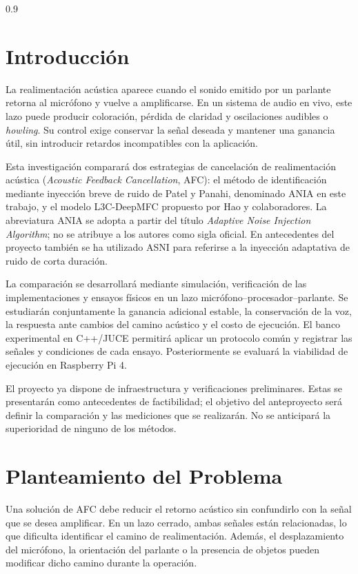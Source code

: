 \clearpage
\begin{spacing}{0.9}
\tableofcontents
\end{spacing}
\thispagestyle{empty}
\clearpage
\pagestyle{estandar}
\setcounter{page}{1}
\justifying
\section{Introducción}
La realimentación acústica aparece cuando el sonido emitido por un parlante retorna al micrófono y vuelve a amplificarse. En un sistema de audio en vivo, este lazo puede producir coloración, pérdida de claridad y oscilaciones audibles o \textit{howling}. Su control exige conservar la señal deseada y mantener una ganancia útil, sin introducir retardos incompatibles con la aplicación.

Esta investigación comparará dos estrategias de cancelación de realimentación acústica (\textit{Acoustic Feedback Cancellation}, AFC): el método de identificación mediante inyección breve de ruido de Patel y Panahi\cite{patel2020}, denominado ANIA en este trabajo, y el modelo L3C-DeepMFC propuesto por Hao y colaboradores\cite{hao2025}. La abreviatura ANIA se adopta a partir del título \textit{Adaptive Noise Injection Algorithm}; no se atribuye a los autores como sigla oficial. En antecedentes del proyecto también se ha utilizado ASNI para referirse a la inyección adaptativa de ruido de corta duración.

La comparación se desarrollará mediante simulación, verificación de las implementaciones y ensayos físicos en un lazo micrófono--procesador--parlante. Se estudiarán conjuntamente la ganancia adicional estable, la conservación de la voz, la respuesta ante cambios del camino acústico y el costo de ejecución. El banco experimental en C++/JUCE permitirá aplicar un protocolo común y registrar las señales y condiciones de cada ensayo. Posteriormente se evaluará la viabilidad de ejecución en Raspberry Pi 4.

El proyecto ya dispone de infraestructura y verificaciones preliminares. Estas se presentarán como antecedentes de factibilidad; el objetivo del anteproyecto será definir la comparación y las mediciones que se realizarán. No se anticipará la superioridad de ninguno de los métodos.

\clearpage
\section{Planteamiento del Problema}
Una solución de AFC debe reducir el retorno acústico sin confundirlo con la señal que se desea amplificar. En un lazo cerrado, ambas señales están relacionadas, lo que dificulta identificar el camino de realimentación. Además, el desplazamiento del micrófono, la orientación del parlante o la presencia de objetos pueden modificar dicho camino durante la operación.

